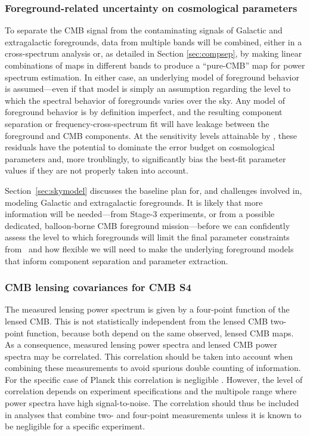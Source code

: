\subsubsection{Foreground-related uncertainty on cosmological parameters}
\label{se:paramforeg}


To separate the CMB signal from the contaminating signals of Galactic and extragalactic foregrounds, 
data from multiple bands will be combined, either 
in a cross-spectrum analysis or, as detailed in Section \ref{sec:compsep}, by making linear 
combinations of maps in different bands to produce a ``pure-CMB'' map for power spectrum estimation.
In either case, an underlying model of foreground behavior is assumed---even if that model is simply
an assumption regarding the level to which the spectral behavior of foregrounds varies over the sky.
Any model of foreground behavior is by definition imperfect, and the resulting component separation
or frequency-cross-spectrum fit will have leakage between the foreground and CMB components.
At the sensitivity levels attainable by \cmbexp, these residuals have the potential to dominate the
error budget on cosmological parameters and, more troublingly, to significantly bias the best-fit 
parameter values if they are not properly taken into account.

Section~\ref{sec:skymodel} discusses the baseline plan for, and challenges involved in, modeling
Galactic and extragalactic foregrounds. It is likely that more information will be needed---from 
Stage-3 experiments, or from a possible dedicated, balloon-borne CMB foreground mission---before
we can confidently assess the level to which foregrounds will limit the final parameter constraints
from \cmbexp\ and how flexible we will need to make the underlying foreground models that 
inform component separation and parameter extraction. 

\subsubsection{CMB lensing covariances for CMB S4}
\label{se:covs}

The measured lensing power spectrum is given by a four-point function of the lensed CMB.  This is not statistically independent from the lensed CMB two-point function, because both depend on the same observed, lensed CMB maps.  As a consequence, measured lensing power spectra and lensed CMB power spectra may be correlated.  This correlation should be taken into account when combining these measurements to avoid spurious double counting of information.  For the specific case of Planck this correlation is negligible  \cite{Schmittfull:2013uea}.  However, the level of correlation depends on experiment specifications and the multipole range where power spectra have high signal-to-noise.  The correlation should thus be included in analyses that combine two- and four-point measurements unless it is known to be negligible for a specific experiment. 

